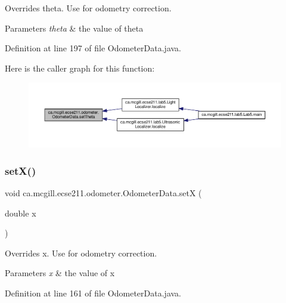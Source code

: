 Overrides theta. Use for odometry correction.


\begin{DoxyParams}{Parameters}
{\em theta} & the value of theta \\
\hline
\end{DoxyParams}


Definition at line 197 of file Odometer\+Data.\+java.

Here is the caller graph for this function\+:
\nopagebreak
\begin{figure}[H]
\begin{center}
\leavevmode
\includegraphics[width=350pt]{classca_1_1mcgill_1_1ecse211_1_1odometer_1_1_odometer_data_a419b8f07c2c5374411c8e62298e9a402_icgraph}
\end{center}
\end{figure}
\mbox{\label{classca_1_1mcgill_1_1ecse211_1_1odometer_1_1_odometer_data_a2911d7215e47f3064defe016b46bfeef}} 
\subsubsection{\texorpdfstring{set\+X()}{setX()}}
{\footnotesize\ttfamily void ca.\+mcgill.\+ecse211.\+odometer.\+Odometer\+Data.\+setX (\begin{DoxyParamCaption}\item[{double}]{x }\end{DoxyParamCaption})}

Overrides x. Use for odometry correction.


\begin{DoxyParams}{Parameters}
{\em x} & the value of x \\
\hline
\end{DoxyParams}


Definition at line 161 of file Odometer\+Data.\+java.

